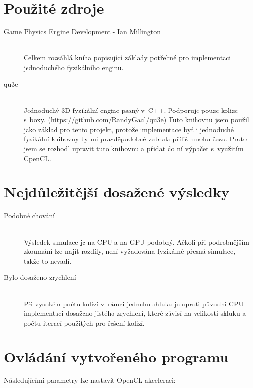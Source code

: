 \documentclass[11pt,a4paper]{article}
\begin{document}
\section{Použité zdroje}

\begin{description}
  \item[Game Physics Engine Development - Ian Millington] ~ \\
    Celkem rozsáhlá kniha popisující základy potřebné pro implementaci
    jednoduchého fyzikálního enginu.
  \item[qu3e] ~ \\
    Jednoduchý 3D fyzikální engine psaný v~C++. Podporuje pouze kolize
    s~boxy. (\url{https://github.com/RandyGaul/qu3e})
    Tuto knihovnu jsem použil jako základ pro tento projekt, protože
    implementace byť i jednoduché fyzikální knihovny by mi pravděpodobně
    zabrala příliš mnoho času. Proto jsem se rozhodl upravit tuto knihovnu
    a přidat do ní výpočet s~využitím OpenCL.
\end{description}

\section{Nejdůležitější dosažené výsledky}

\begin{description}
  \item[Podobné chování] ~ \\
    Výsledek simulace je na CPU a na GPU podobný. Ačkoli při podrobnějším zkoumání
    lze najít rozdíly, není vyžadována fyzikálně přesná simulace, takže to nevadí.
  \item[Bylo dosaženo zrychlení] ~ \\
    Při vysokém počtu kolizí v~rámci jednoho shluku je oproti původní CPU
    implementaci dosaženo jistého zrychlení, které závisí na velikosti
    shluku a počtu iterací použitých pro řešení kolizí.
\end{description}

\section{Ovládání vytvořeného programu}

Následujícími parametry lze nastavit OpenCL akceleraci:
\end{document}
